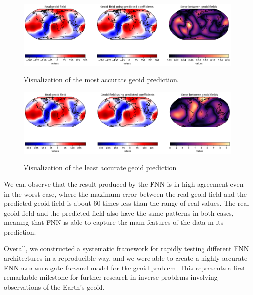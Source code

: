\begin{figure}[H]
    \caption{Visualization of the most accurate geoid prediction.}
    \includegraphics[scale=0.4]{figures/geoid_images/Geoid_Best_visualization.png}
    \label{figure:geoid_best_visual}
\end{figure}

\begin{figure}[H]
    \caption{Visualization of the least accurate geoid prediction.}
    \includegraphics[scale=0.4]{figures/geoid_images/Geoid_Worst_visualization.png}
    \label{figure:geoid_worst_visual}
\end{figure}

We can observe that the result produced by the FNN is in high agreement even in the worst case, where the maximum error between the real geoid field and the predicted geoid field is about 60 times less than the range of real values. The real geoid field and the predicted field also have the same patterns in both cases, meaning that FNN is able to capture the main features of the data in its prediction.

Overall, we constructed a systematic framework for rapidly testing different FNN architectures in a reproducible way, and we were able to create a highly accurate FNN as a surrogate forward model for the geoid problem. This represents a first remarkable milestone for further research in inverse problems involving observations of the Earth's geoid.